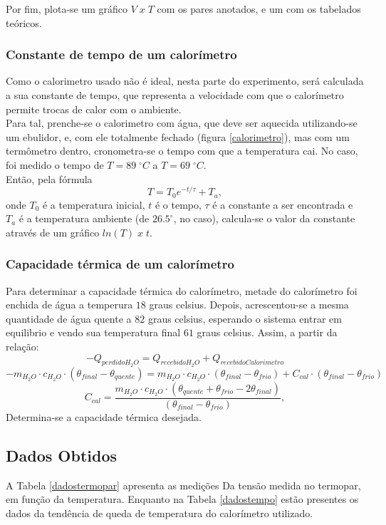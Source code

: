 \documentclass[12pt,a4paper]{article}
\begin{document}
Por fim, plota-se um gráfico $V \; x \; T$ com os pares anotados, e um com os tabelados teóricos.\\

\subsubsection{Constante de tempo de um calorímetro}

Como o calorimetro usado não é ideal, nesta parte do experimento, será calculada a sua constante de tempo, que representa a velocidade com que o calorímetro permite trocas de calor com o ambiente.\\
Para tal, prenche-se o calorimetro com água, que deve ser aquecida utilizando-se um ebulidor, e, com ele totalmente fechado (figura \ref{calorimetro}), mas com um termômetro dentro, cronometra-se o tempo com que a temperatura cai. No caso, foi medido o tempo de $T = 89 \; ^{\circ} C$ a $T = 69 \; ^{\circ} C$.\\
Então, pela fórmula 
$$T = T_0 e ^{-t/\tau} + T_a,$$
onde $T_0$ é a temperatura inicial, $t$ é o tempo, $\tau$ é a constante a ser encontrada e $T_a$ é a temperatura ambiente (de $26.5 ^{\circ}$, no caso), calcula-se o valor da constante através de um gráfico $ln(T) \; x \; t$.


\subsubsection{Capacidade térmica de um calorímetro}
Para determinar a capacidade térmica do calorímetro, metade do calorímetro foi enchida de água a temperura $18$ graus celsius. Depois, acrescentou-se a mesma quantidade de água quente a $82$ graus celsius, esperando o sistema entrar em equilibrio e vendo sua temperatura final $61$ graus celsius. Assim, a partir da relação:
$$-Q_{perdido H_2O} = Q_{recebido H_2O} + Q_{recebido Calorimetro}$$
$$-m_{H_2O}\cdot c_{H_2O} \cdot (\theta_{final}-\theta_{quente}) = m_{H_2O}\cdot c_{H_2O} \cdot (\theta_{final}-\theta_{frio}) + C_{cal}\cdot (\theta_{final}-\theta_{frio}) $$
$$C_{cal} = \frac{m_{H_2O}\cdot c_{H_2O}\cdot(\theta_{quente} + \theta_{frio} -2\theta_{final})}{(\theta_{final}-\theta_{frio})},$$
Determina-se a capacidade térmica desejada.


\subsection{Dados Obtidos}

A Tabela \ref{dadostermopar} apresenta as medições Da tensão medida no termopar, em função da temperatura. Enquanto na Tabela \ref{dadostempo} estão presentes os
dados da tendência de queda de temperatura do calorímetro utilizado.
\end{document}
